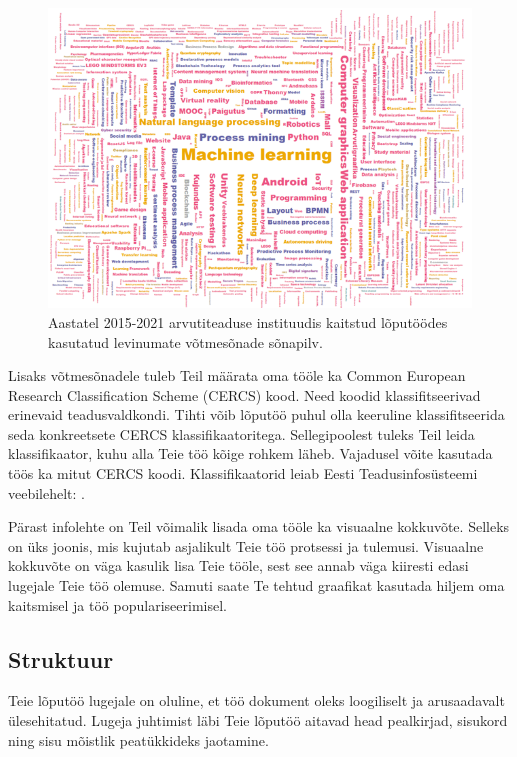 \begin{figure}[h]
    \centering
    \captionsetup{justification=centering}
    \includegraphics[width=\textwidth]{figures/Joonis1-Võtmesõnad.png}
    \caption{Aastatel 2015-2021 arvutiteaduse instituudis kaitstud lõputöödes kasutatud levinumate võtmesõnade sõnapilv.}
    \label{fig:võtmesõnad}
\end{figure}

Lisaks võtmesõnadele tuleb Teil määrata oma tööle ka Common European Research Classification Scheme (CERCS) kood. Need koodid klassifitseerivad erinevaid teadusvaldkondi. Tihti võib lõputöö puhul olla keeruline klassifitseerida seda konkreetsete CERCS klassifikaatoritega. Sellegipoolest tuleks Teil leida klassifikaator, kuhu alla Teie töö kõige rohkem läheb. Vajadusel võite kasutada töös ka mitut CERCS koodi. Klassifikaatorid leiab Eesti Teadusinfosüsteemi veebilehelt: .

Pärast infolehte on Teil võimalik lisada oma tööle ka visuaalne kokkuvõte. Selleks on üks joonis, mis kujutab asjalikult Teie töö protsessi ja tulemusi. Visuaalne kokkuvõte on väga kasulik lisa Teie tööle, sest see annab väga kiiresti edasi lugejale Teie töö olemuse. Samuti saate Te tehtud graafikat kasutada hiljem oma kaitsmisel ja töö populariseerimisel.

\subsection{Struktuur}
Teie lõputöö lugejale on oluline, et töö dokument oleks loogiliselt ja arusaadavalt ülesehitatud. Lugeja juhtimist läbi Teie lõputöö aitavad head pealkirjad, sisukord ning sisu mõistlik peatükkideks jaotamine.

